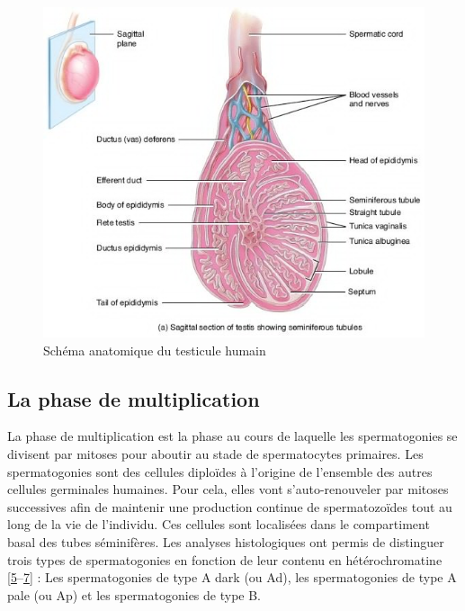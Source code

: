 \documentclass[12pt,twoside]{reedthesis}
\theoremstyle{definition}
\theoremstyle{definition}
\theoremstyle{remark}
\begin{document}
  \begin{figure}
  
  {\centering \includegraphics[scale=0.65]{figure/coupe_testicule2} 
  
  }
  
  \caption{Schéma anatomique du testicule humain}\label{fig:testicule}
  \end{figure}
  
  \newpage
  
  \subsection{La phase de
  multiplication}\label{la-phase-de-multiplication}
  
  La phase de multiplication est la phase au cours de laquelle les
  spermatogonies se divisent par mitoses pour aboutir au stade de
  spermatocytes primaires. Les spermatogonies sont des cellules diploïdes
  à l'origine de l'ensemble des autres cellules germinales humaines. Pour
  cela, elles vont s'auto-renouveler par mitoses successives afin de
  maintenir une production continue de spermatozoïdes tout au long de la
  vie de l'individu. Ces cellules sont localisées dans le compartiment
  basal des tubes séminifères. Les analyses histologiques ont permis de
  distinguer trois types de spermatogonies en fonction de leur contenu en
  hétérochromatine
  {[}\protect\hyperlink{ref-Clermont1963}{5}--\protect\hyperlink{ref-Goossens2013}{7}{]}
  : Les spermatogonies de type A dark (ou Ad), les spermatogonies de type
  A pale (ou Ap) et les spermatogonies de type B.
  
\end{document}
